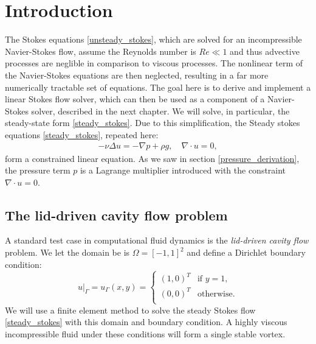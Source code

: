 \section{Introduction}
The Stokes equations \eqref{unsteady_stokes}, which are solved for an incompressible Navier-Stokes flow,
assume the Reynolds number is $Re \ll 1$ and thus advective processes are neglible in comparison to viscous processes.
The nonlinear term of the Navier-Stokes equations are then neglected, resulting in a far more numerically tractable set of equations.
The goal here is to derive and implement a linear Stokes flow solver, which can then be used as a component of a Navier-Stokes solver,
described in the next chapter.
We will solve, in particular, the steady-state form \eqref{steady_stokes}.
Due to this simplification, the Steady stokes equations \eqref{steady_stokes}, repeated here:
\begin{align*}
    -\nu\Delta u = -\nabla p + \rho g, \quad \nabla\cdot u = 0,
\end{align*}
form a constrained linear equation. As we saw in section \ref{pressure_derivation}, the pressure term $p$ is a Lagrange multiplier introduced
with the constraint $\nabla\cdot u = 0$.

\subsection{The lid-driven cavity flow problem}
A standard test case in computational fluid dynamics is the \textit{lid-driven cavity flow} problem.
We let the domain be is $\Omega = [-1,1]^2$ and define a Dirichlet boundary condition:
\begin{equation}\label{lid_driven_boundary_condition}
    \left.u\right|_\Gamma = u_\Gamma(x,y) =
    \left\{\begin{array}{lr}
        \left(1, 0\right)^T &\text{if $y = 1$,}\\
        \left(0, 0\right)^T &\text{otherwise}.\\
        \end{array}\right.
\end{equation}
We will use a finite element method to solve the steady Stokes flow \eqref{steady_stokes} with this domain and boundary condition. A highly viscous incompressible
fluid under these conditions will form a single stable vortex.


